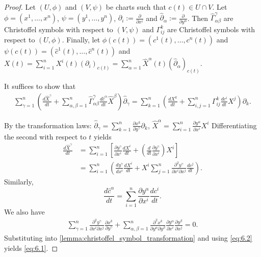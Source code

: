 \begin{proof}
Let $(U,\phi)$ and $(V, \psi)$ be charts such that $c(t) \in U \cap V$. 
Let $\phi = (x^1, \dots, x^n)$, $\psi = (y^1, \dots, y^n)$, $\partial_i := \frac{\partial}{\partial x^i}$ and $\hat{\partial}_{\alpha} := \frac{\partial}{\partial y^{\alpha}}$.
Then $\hat{\Gamma}_{\alpha\beta}^{\gamma}$ are Christoffel symbols with respect to $(V, \psi)$ and $\Gamma_{ij}^k$ are Christoffel symbols with respect to $(U, \phi)$.
Finally, let $\phi(c(t)) = (c^1(t), \dots, c^n(t))$ and $\psi(c(t)) = (\hat{c}^1(t), \dots, \hat{c}^n(t))$ and $X(t) = \sum_{i=1}^n X^i(t)(\partial_i)_{c(t)} = \sum_{\alpha=1}^n \hat{X}^{\alpha}(t)(\hat{\partial}_{\alpha})_{c(t)}$.

It suffices to show that
\begin{align}\label{eq:6.1}
\sum_{\gamma=1}^n \left( \frac{d\hat{X}^{\gamma}}{dt} + \sum_{\alpha, \beta=1}^n \hat{\Gamma}_{\alpha\beta}^{\gamma}\frac{d\hat{c}^{\alpha}}{dt}\hat{X}^{\beta} \right)\hat{\partial}_{\gamma}
= \sum_{k=1}^n \left( \frac{dX^k}{dt} + \sum_{i,j=1}^n \Gamma_{ij}^k\frac{dc^i}{dt}X^j \right)\partial_k.
\end{align}

By the transformation laws: $\hat{\partial}_{\gamma} = \sum_{k=1}^n \frac{\partial x^k}{\partial y^{\gamma}}\partial_k$, $\hat{X}^{\alpha} = \sum_{i=1}^n \frac{\partial y^{\alpha}}{\partial x^i}X^i$
Differentiating the second with respect to $t$ yields
\[
\begin{aligned}
\frac{d\hat{X}^{\gamma}}{dt} &= \sum_{i=1}^n \left[ \frac{\partial y^{\gamma}}{\partial x^i}\frac{dX^i}{dt} + \left(\frac{d}{dt}\frac{\partial y^{\gamma}}{\partial x^i}\right)X^i \right] \\
&= \sum_{i=1}^n \left( \frac{dy^{\gamma}}{dx^i}\frac{dX^i}{dt} + X^i\sum_{j=1}^n \frac{\partial^2y^{\gamma}}{\partial x^i \partial x^j}\frac{dc^j}{dt} \right).
\end{aligned}
\]
Similarly,
\[
\frac{d\hat{c}^{\alpha}}{dt} = \sum_{i=1}^n \frac{\partial y^{\alpha}}{\partial x^i}\frac{dc^i}{dt}.
\]
We also have
\begin{align}\label{eq:6.2}
\sum_{\gamma = 1}^n \frac{\partial^2y^{\gamma}}{\partial x^i\partial x ^j}\frac{\partial x^k}{\partial y^{\gamma}} + \sum_{\alpha, \beta=1}^n \frac{\partial^2 x^k}{\partial y^{\alpha}\partial y^{\beta}}\frac{\partial y^{\alpha}}{\partial x^i}\frac{\partial y^{\beta}}{\partial x^j} = 0.
\end{align}
Substituting into \autoref{lemma:christoffel_symbol_transformation} and using \eqref{eq:6.2} yields \eqref{eq:6.1}.


\end{proof}
